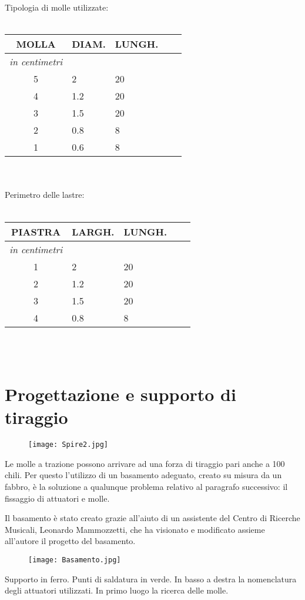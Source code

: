 Tipologia di molle utilizzate:
\\ \\
\begin{tabular}{cp{2cm}p{2cm}p{.2cm}p{2cm}} \textbf{MOLLA}&\textbf{DIAM.}&\textbf{LUNGH.}\\
\hline \textit{in centimetri} \\
\hline 5&2&20\\
\hline 4&1.2&20\\
\hline 3&1.5&20\\
\hline 2&0.8&8\\
\hline 1&0.6&8\\
\end{tabular}
\\ \\
Perimetro delle lastre:
\\ \\
\begin{tabular}{cp{2cm}p{2cm}p{.2cm}p{2cm}} \textbf{PIASTRA}&\textbf{LARGH.}&\textbf{LUNGH.}\\
\hline \textit{in centimetri} \\
\hline 1&2&20\\
\hline 2&1.2&20\\
\hline 3&1.5&20\\
\hline 4&0.8&8\\
\end{tabular}
\\ \\

\section{Progettazione e supporto di tiraggio}

 \begin{figure}[htbp]
        \centering
        \texttt{[image: Spire2.jpg]}
\end{figure}

Le molle a trazione possono arrivare ad una forza di tiraggio pari anche a 100 chili. Per questo l'utilizzo di un basamento adeguato, creato su misura da un fabbro, è la soluzione a qualunque problema relativo al paragrafo successivo: il fissaggio di attuatori e molle.

Il basamento è stato creato grazie all'aiuto di un assistente del Centro di Ricerche Musicali, Leonardo Mammozzetti, che ha visionato e modificato assieme all'autore il progetto del basamento.  \begin{figure}[htbp]
        \centering
        \texttt{[image: Basamento.jpg]}
\end{figure}
Supporto in ferro. Punti di saldatura in verde. In basso a destra la nomenclatura degli attuatori utilizzati.
In primo luogo la ricerca delle molle.

